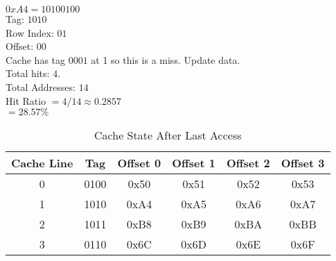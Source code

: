 \documentclass{article}
\begin{document}
{     $0xA4 = 1010 0100$ \\
     Tag: $1010$ \\
     Row Index: $01$ \\
     Offset: $00$ \\
     Cache has tag $0001$ at 1 so this is a miss.
     Update data. \\

     Total hits: $4$. \\
     Total Addresses: $14$ \\
     Hit Ratio $= 4 / 14 \approx 0.2857$ \\
     $ = 28.57\%$ \\
}

 {
     \begin{table}[h!]
          \centering
          \begin{tabular}{|c|c|c|c|c|c|}
          \hline
          \textbf{Cache Line} & \textbf{Tag} & \textbf{Offset 0} & \textbf{Offset 1} & \textbf{Offset 2} & \textbf{Offset 3} \\ \hline
          0 & 0100 & 0x50 & 0x51 & 0x52 & 0x53 \\ \hline
          1 & 1010 & 0xA4 & 0xA5 & 0xA6 & 0xA7 \\ \hline
          2 & 1011 & 0xB8 & 0xB9 & 0xBA & 0xBB \\ \hline
          3 & 0110 & 0x6C & 0x6D & 0x6E & 0x6F \\ \hline
          \end{tabular}
          \caption{Cache State After Last Access}
     \end{table}
}
\end{document}
